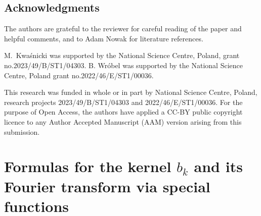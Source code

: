 \documentclass[a4paper,12pt,reqno]{amsart}
\numberwithin{equation}{section}
\theoremstyle{definition}
\begin{document}
\subsection*{Acknowledgments}
\mbox{}The authors are grateful to the reviewer for careful reading of the paper and helpful comments, and to Adam Nowak for literature references.

M.\ Kwaśnicki was supported by the National Science Centre, Poland, grant no.\@ 2023/49/B/ST1/04303. B. Wr{\'o}bel was supported by the National Science Centre, Poland grant no.\@ 2022/46/E/ST1/00036.

This research was funded in whole or in part by National Science Centre, Poland, research projects
2023/49/B/ST1/04303 and 2022/46/E/ST1/00036. For the purpose of Open Access, the authors have applied a
CC-BY public copyright licence to any Author Accepted Manuscript (AAM) version arising from this submission.


\section{Formulas for the kernel \texorpdfstring{$b_k$}{bk} and its Fourier transform via special functions}
\label{sec: form}
\end{document}
